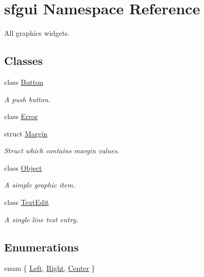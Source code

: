 \hypertarget{namespacesfgui}{
\section{sfgui Namespace Reference}
\label{namespacesfgui}
}
All graphics widgets.  


\subsection*{Classes}
\begin{CompactItemize}
\item 
class \hyperlink{classsfgui_1_1Button}{Button}
\begin{CompactList}\small\item\em A push button. \item\end{CompactList}\item 
class \hyperlink{classsfgui_1_1Error}{Error}
\item 
struct \hyperlink{structsfgui_1_1Margin}{Margin}
\begin{CompactList}\small\item\em Struct which contains margin values. \item\end{CompactList}\item 
class \hyperlink{classsfgui_1_1Object}{Object}
\begin{CompactList}\small\item\em A simple graphic item. \item\end{CompactList}\item 
class \hyperlink{classsfgui_1_1TextEdit}{TextEdit}
\begin{CompactList}\small\item\em A single line text entry. \item\end{CompactList}\end{CompactItemize}
\subsection*{Enumerations}
\begin{CompactItemize}
\item 
enum \{ \hyperlink{namespacesfgui_ed969f0aaa542b462035e828757f431328ce9405120beac8fae51bc232aeabec}{Left}, 
\hyperlink{namespacesfgui_ed969f0aaa542b462035e828757f4313d4fbbcf5a5a40412eeb0175f82c85b3f}{Right}, 
\hyperlink{namespacesfgui_ed969f0aaa542b462035e828757f43130172869b534ad2378e28e388342699cc}{Center}
 \}
\end{CompactItemize}


